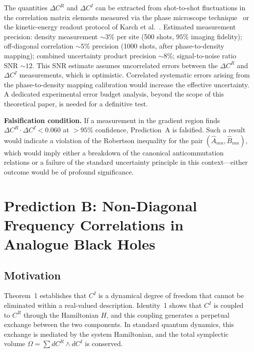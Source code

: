\documentclass[aps,pra,preprint,groupedaddress,amsmath,amssymb,floatfix]{revtex4-2}
\begin{document}
The quantities $\Delta C^R$ and $\Delta C^I$ can be extracted from shot-to-shot fluctuations in the correlation matrix elements measured via the phase microscope technique~\cite{bruggenjurgen2024} or the kinetic-energy readout protocol of Karch et al.~\cite{karch2024}. Estimated measurement precision: density measurement $\sim 3\%$ per site (500 shots, $95\%$ imaging fidelity); off-diagonal correlation $\sim 5\%$ precision (1000 shots, after phase-to-density mapping); combined uncertainty product precision $\sim 8\%$; signal-to-noise ratio SNR $\sim 12$. This SNR estimate assumes uncorrelated errors between the $\Delta C^R$ and $\Delta C^I$ measurements, which is optimistic. Correlated systematic errors arising from the phase-to-density mapping calibration would increase the effective uncertainty. A dedicated experimental error budget analysis, beyond the scope of this theoretical paper, is needed for a definitive test.

\textbf{Falsification condition.} If a measurement in the gradient region finds $\Delta C^R \cdot \Delta C^I < 0.060$ at $> 95\%$ confidence, Prediction~A is falsified. Such a result would indicate a violation of the Robertson inequality for the pair $(\hat{A}_{mn}, \hat{B}_{mn})$, which would imply either a breakdown of the canonical anticommutation relations or a failure of the standard uncertainty principle in this context---either outcome would be of profound significance.

\section{Prediction B: Non-Diagonal Frequency Correlations in Analogue Black Holes}

\subsection{Motivation}

Theorem~1 establishes that $C^I$ is a dynamical degree of freedom that cannot be eliminated within a real-valued description. Identity~1 shows that $C^I$ is coupled to $C^R$ through the Hamiltonian $H$, and this coupling generates a perpetual exchange between the two components. In standard quantum dynamics, this exchange is mediated by the system Hamiltonian, and the total symplectic volume $\Omega = \sum dC^R \wedge dC^I$ is conserved.
\end{document}
